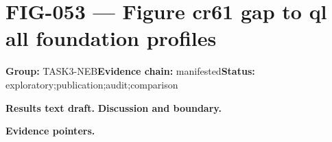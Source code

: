 \clearpage
\section{FIG-053 --- Figure cr61 gap to ql all foundation profiles}
\label{figpage:fig-053}
\textbf{Group:} TASK3-NEB\quad \textbf{Evidence chain:} manifested\quad \textbf{Status:} exploratory;publication;audit;comparison

\textbf{Results text draft.} 
\textbf{Discussion and boundary.} 


\textbf{Evidence pointers.}



\vfill
